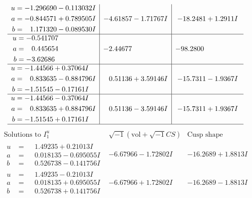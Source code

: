\documentclass[1p]{elsarticle_modified}
\theoremstyle{definition}
\newcommand{\I}{\sqrt{-1}}
\begin{document}
$$\begin{array}{c|c|c}
\begin{aligned}
u &= -1.296690 - 0.113032 I \\
a &= -0.844571 + 0.789505 I \\
b &= \phantom{-}1.171320 - 0.089530 I\end{aligned}
 & -4.61857 - 1.71767 I & -18.2481 + 1.2911 I \\ \hline\begin{aligned}
u &= -0.541707\phantom{ +0.000000I} \\
a &= \phantom{-}0.445654\phantom{ +0.000000I} \\
b &= -3.62686\phantom{ +0.000000I}\end{aligned}
 & -2.44677\phantom{ +0.000000I} & -98.2800\phantom{ +0.000000I} \\ \hline\begin{aligned}
u &= -1.44566 + 0.37064 I \\
a &= \phantom{-}0.833635 - 0.884796 I \\
b &= -1.51545 - 0.17161 I\end{aligned}
 & \phantom{-}0.51136 + 3.59146 I & -15.7311 - 1.9367 I \\ \hline\begin{aligned}
u &= -1.44566 - 0.37064 I \\
a &= \phantom{-}0.833635 + 0.884796 I \\
b &= -1.51545 + 0.17161 I\end{aligned}
 & \phantom{-}0.51136 - 3.59146 I & -15.7311 + 1.9367 I\\
 \hline 
 \end{array}$$\newpage$$\begin{array}{c|c|c}  
\text{Solutions to }I^u_{1}& \I (\text{vol} + \sqrt{-1}CS) & \text{Cusp shape}\\
 \hline 
\begin{aligned}
u &= \phantom{-}1.49235 + 0.21013 I \\
a &= \phantom{-}0.018135 - 0.695055 I \\
b &= \phantom{-}0.526738 - 0.141756 I\end{aligned}
 & -6.67966 - 1.72802 I & -16.2689 + 1.8813 I \\ \hline\begin{aligned}
u &= \phantom{-}1.49235 - 0.21013 I \\
a &= \phantom{-}0.018135 + 0.695055 I \\
b &= \phantom{-}0.526738 + 0.141756 I\end{aligned}
 & -6.67966 + 1.72802 I & -16.2689 - 1.8813 I \\ \hline\begin{aligned}

\end{aligned}
\end{array}$$
\end{document}
